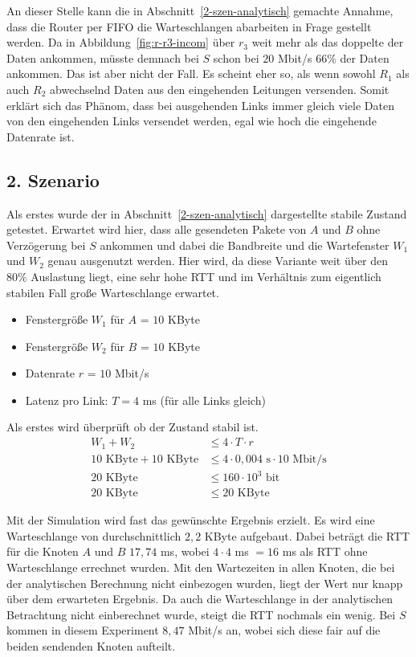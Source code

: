 \documentclass [10pt,a4paper]{article}
\begin{document}
		An dieser Stelle kann die in Abschnitt~\ref{2-szen-analytisch} gemachte Annahme, dass die Router per FIFO die Warteschlangen abarbeiten in Frage gestellt werden. Da in Abbildung~\ref{fig:r-r3-incom} über $r_3$ weit mehr als das doppelte der Daten ankommen, müsste demnach bei $S$ schon bei $20$ Mbit/s $66\%$ der Daten ankommen. Das ist aber nicht der Fall. Es scheint eher so, als wenn sowohl $R_1$ als auch $R_2$ abwechselnd Daten aus den eingehenden Leitungen versenden. Somit erklärt sich das Phänom, dass bei ausgehenden Links immer gleich viele Daten von den eingehenden Links versendet werden, egal wie hoch die eingehende Datenrate ist.
		
	\subsection{2. Szenario}
		Als erstes wurde der in Abschnitt~\ref{2-szen-analytisch} dargestellte stabile Zustand getestet. Erwartet wird hier, dass alle gesendeten Pakete von $A$ und $B$ ohne Verzögerung bei $S$ ankommen und dabei die Bandbreite und die Wartefenster $W_1$ und $W_2$ genau ausgenutzt werden. Hier wird, da diese Variante weit über den $80\%$ Auslastung liegt, eine sehr hohe RTT und im Verhältnis zum eigentlich stabilen Fall große Warteschlange erwartet.
		\begin{itemize}
			\item Fenstergröße $W_1$ für $A$ = $10$ KByte
			\item Fenstergröße $W_2$ für $B$ = $10$ KByte
			\item Datenrate $r$ = $10$ Mbit/s
			\item Latenz pro Link: $T=4$ ms (für alle Links gleich)
		\end{itemize}
		Als erstes wird überprüft ob der Zustand stabil ist.
		\begin{align*}
		W_1+W_2 &\leq 4\cdot T\cdot r \\
		10 \text{ KByte} +10 \text{ KByte} &\leq 4\cdot 0,004 \text{ s}\cdot 10 \text{ Mbit/s} \\
		20 \text{ KByte} &\leq 160\cdot 10^{3} \text{ bit} \\
		20 \text{ KByte} &\leq 20 \text{ KByte}
		\end{align*}
		
		Mit der Simulation wird fast das gewünschte Ergebnis erzielt. Es wird eine Warteschlange von durchschnittlich $2,2$ KByte aufgebaut. Dabei beträgt die RTT für die Knoten $A$ und $B$ $17,74$ ms, wobei $4\cdot 4$ ms $=16$ ms als RTT ohne Warteschlange errechnet wurden. Mit den Wartezeiten in allen Knoten, die bei der analytischen Berechnung nicht einbezogen wurden, liegt der Wert nur knapp über dem erwarteten Ergebnis. Da auch die Warteschlange in der analytischen Betrachtung nicht einberechnet wurde, steigt die RTT nochmals ein wenig. Bei $S$ kommen in diesem Experiment $8,47$ Mbit/s an, wobei sich diese fair auf die beiden sendenden Knoten aufteilt.
		
\end{document}
